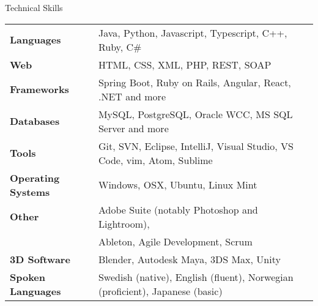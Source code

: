 \documentclass{resume} %
\begin{document}

\begin{rSection}{Technical Skills}

\begin{tabular}{ @{} >{\bfseries}l @{\hspace{6ex}} l }
Languages & Java, Python, Javascript, Typescript, C++, Ruby, C\# \\
Web & HTML, CSS, XML, PHP, REST, SOAP \\
Frameworks & Spring Boot, Ruby on Rails, Angular, React, .NET and more \\
Databases & MySQL, PostgreSQL, Oracle WCC, MS SQL Server and more\\
Tools & Git, SVN, Eclipse, IntelliJ, Visual Studio, VS Code, vim, Atom, Sublime \\
Operating Systems & Windows, OSX, Ubuntu, Linux Mint \\
Other & Adobe Suite (notably Photoshop and Lightroom), \\ & Ableton, Agile Development, Scrum \\
3D Software & Blender, Autodesk Maya, 3DS Max, Unity \\
Spoken Languages & Swedish (native), English (fluent), Norwegian (proficient), Japanese (basic) \\
\end{tabular}

\end{rSection}





\end{document}
